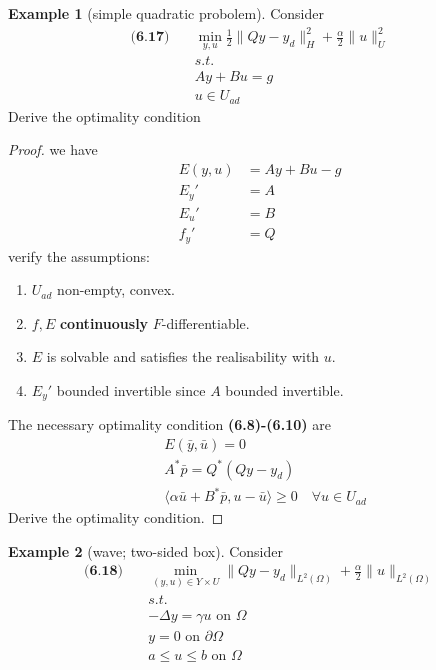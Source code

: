 \documentclass[a4paper,11pt,fleqn]{book}
\theoremstyle{definition}
\newtheorem*{example}{Example}
\theoremstyle{remark}
\begin{document}
\begin{example}[simple quadratic probolem]
Consider 
\begin{align*}
	\textbf{(6.17)}\quad
	&\min_{y,u} \frac{1}{2}\|Qy - y_d\|_H^2 + \frac{\alpha}{2}\|u\|_U^2\\
	&s.t.\\
	&Ay + Bu = g \\
	&u \in U_{ad}
\end{align*}	
Derive the optimality condition
\begin{proof}
we have
\begin{align*}
	E(y, u) &= Ay + Bu - g\\
	E_y' &= A\\
	E_u' &= B\\
	f_y' &= Q
\end{align*}
verify the assumptions:
\begin{enumerate}
	\item $U_{ad}$ non-empty, convex. 
	\item $f, E$ \textbf{continuously} $F$-differentiable. \text{}
	\item $E$ is solvable and satisfies the realisability with $u$. 
	\item $E_y'$ bounded invertible since $A$ bounded invertible. 
\end{enumerate}
The necessary optimality condition \textbf{(6.8)-(6.10)} are
\begin{align*}
	&E(\bar{y}, \bar{u}) = 0\\
	&A^* \bar{p} = Q^*(Qy - y_d)\\
	&\langle \alpha \bar{u} + B^* \bar{p} , u - \bar{u} \rangle \ge 0 \quad \forall u \in U_{ad}
\end{align*}
Derive the optimality condition.
\end{proof}
\end{example}

\begin{example}[wave; two-sided box]
Consider 
\begin{align*}
	\textbf{(6.18)} \quad 
	&\min_{(y, u) \in Y \times U} \|Qy - y_d\|_{L^2(\Omega)} + \frac{\alpha}{2}\|u\|_{L^2(\Omega)}\\
	&s.t.\\
	&- \Delta y = \gamma u \text{ on } \Omega \\
	&y = 0 \text{ on } \partial \Omega\\
	&a \le u \le b \text{ on } \Omega
\end{align*}
	
\end{example}
\end{document}
